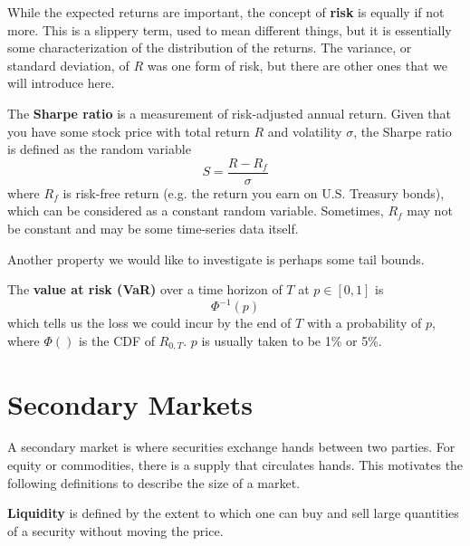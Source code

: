 \documentclass{article}
\begin{document}
    While the expected returns are important, the concept of \textbf{risk} is equally if not more. This is a slippery term, used to mean different things, but it is essentially some characterization of the distribution of the returns. The variance, or standard deviation, of $R$ was one form of risk, but there are other ones that we will introduce here. 

    \begin{definition}
      The \textbf{Sharpe ratio} is a measurement of risk-adjusted annual return. Given that you have some stock price with total return $R$ and volatility $\sigma$, the Sharpe ratio is defined as the random variable
      \begin{equation}
        S = \frac{R - R_f}{\sigma}
      \end{equation}
      where $R_f$ is risk-free return (e.g. the return you earn on U.S. Treasury bonds), which can be considered as a constant random variable. Sometimes, $R_f$ may not be constant and may be some time-series data itself. 
    \end{definition}

    Another property we would like to investigate is perhaps some tail bounds. 

    \begin{definition}
      The \textbf{value at risk (VaR)} over a time horizon of $T$ at $p \in [0, 1]$ is 
      \begin{equation}
        \Phi^{-1}(p)
      \end{equation}
      which tells us the loss we could incur by the end of $T$ with a probability of $p$, where $\Phi()$ is the CDF of $R_{0, T}$. $p$ is usually taken to be 1\% or 5\%. 
    \end{definition}

\section{Secondary Markets}

    A secondary market is where securities exchange hands between two parties. For equity or commodities, there is a supply that circulates hands. This motivates the following definitions to describe the size of a market. 

    \begin{definition}[Liquidity]
      \textbf{Liquidity} is defined by the extent to which one can buy and sell large quantities of a security without moving the price. 
    \end{definition}
\end{document}
